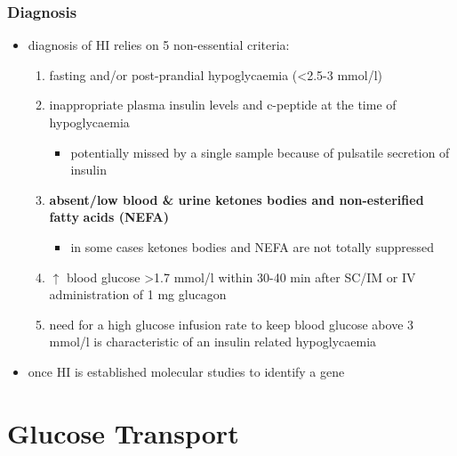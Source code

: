 \documentclass[12pt]{scrartcl}
\begin{document}
\subsubsection{Diagnosis}
\label{sec:org3e673cc}
\begin{itemize}
\item diagnosis of HI relies on 5 non-essential criteria:
\begin{enumerate}
\item fasting and/or post-prandial hypoglycaemia (\textless{}2.5-3 mmol/l)
\item inappropriate plasma insulin levels and c-peptide at the time of
hypoglycaemia
\begin{itemize}
\item potentially missed by a single sample because of pulsatile
secretion of insulin
\end{itemize}
\item \textbf{absent/low blood \& urine ketones bodies and non-esterified fatty}
\textbf{acids (NEFA)}
\begin{itemize}
\item in some cases ketones bodies and NEFA are not totally
suppressed
\end{itemize}
\item \(\uparrow\) blood glucose \textgreater{}1.7 mmol/l within 30-40 min after
SC/IM or IV administration of 1 mg glucagon
\item need for a high glucose infusion rate to keep blood
glucose above 3 mmol/l is characteristic of an insulin related
hypoglycaemia
\end{enumerate}

\item once HI is established molecular studies to identify a gene
\end{itemize}
\section{Glucose Transport}
\label{sec:org719823d}
\end{document}
